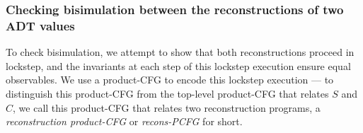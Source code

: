 \subsubsection{Checking bisimulation between the reconstructions of two ADT values}
\label{sec:bisim}
To check bisimulation, we attempt to show that both reconstructions
proceed in lockstep, and the invariants at
each step of this lockstep execution ensure equal observables.
We use a product-CFG to encode this lockstep execution --- to distinguish this
product-CFG from the top-level product-CFG that relates $S$ and $C$, we call
this product-CFG that relates two reconstruction programs, a {\em reconstruction product-CFG}
or {\em recons-PCFG} for short.




